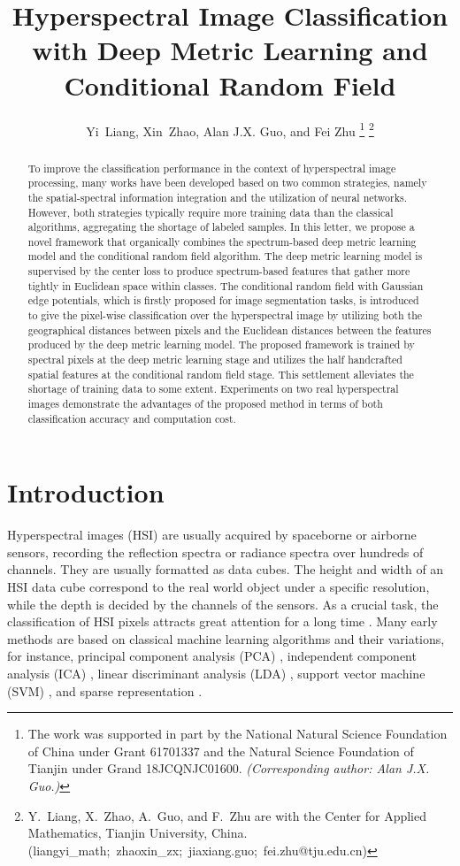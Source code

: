 \documentclass[]{article}
\title{Hyperspectral Image Classification with Deep Metric Learning and Conditional Random Field}
\author{Yi~Liang, Xin~Zhao, Alan J.X. Guo, and Fei Zhu
    \thanks{The work was supported in part by the National Natural Science Foundation of China under Grant 61701337 and the Natural Science Foundation of Tianjin under Grand 18JCQNJC01600. \emph{(Corresponding author: Alan J.X. Guo.)} 
    }
	\thanks{Y.~Liang, X.~Zhao, A.~Guo, and F.~Zhu are with the Center for Applied Mathematics, Tianjin University, China. (liangyi\_math;~zhaoxin\_zx;~jiaxiang.guo;~fei.zhu@tju.edu.cn) }
}
\newcommand{\magentaso}{\color{black}}
\begin{document}
	
\maketitle
\begin{abstract}
To improve the classification performance in the context of
hyperspectral image processing, many works have been developed based on two common strategies,
namely the spatial-spectral information integration and the utilization of neural networks.
However, both strategies typically require more training data than the classical algorithms, 
aggregating the shortage of labeled samples.
In this letter, we propose a novel framework that organically combines 
{\magentaso the} spectrum-based deep metric learning model
and the conditional random field algorithm.
The deep metric learning model is supervised by the center loss 
to produce spectrum-based features that gather more tightly {\magentaso in Euclidean space within classes}. 
{\magentaso The conditional random field with Gaussian edge potentials, which is firstly proposed for image 
segmentation tasks, is introduced to give the pixel-wise classification over the hyperspectral image 
by utilizing both the geographical distances between pixels and the Euclidean distances between the features 
produced by the deep metric learning model. 
}
The proposed framework is trained by spectral pixels at the deep metric learning stage
and utilizes the half handcrafted spatial features at the conditional random field stage.
This settlement alleviates the shortage of training data to some extent.
Experiments on two real hyperspectral images demonstrate the advantages of the proposed method in terms of both
classification accuracy and computation cost.
\end{abstract}
	
\section{Introduction}
Hyperspectral images (HSI) are usually acquired by spaceborne or airborne sensors,
recording the reflection {\magentaso spectra} or radiance spectra over hundreds of channels.
They are usually formatted as data cubes.
The height and width of an HSI data cube {\magentaso correspond} to the real world object under a specific resolution,
while the depth is decided by the channels of the sensors.
As a crucial task, the classification of HSI pixels attracts great attention for a long time \cite{lu2007survey,fauvel2013advances,li2018discriminant}.
Many early methods are based on classical machine learning algorithms and their variations,
for instance, principal component analysis (PCA)
\cite{prasad2008limitations, jiang2018superpca},
independent component analysis (ICA) \cite{villa2011hyperspectral},
linear discriminant analysis (LDA) \cite{bandos2009classification, li2011locality},
support vector machine (SVM)
\cite{melgani2004classification},
and sparse representation
\cite{chen2011hyperspectral, fang2014spectral}.
\end{document}
